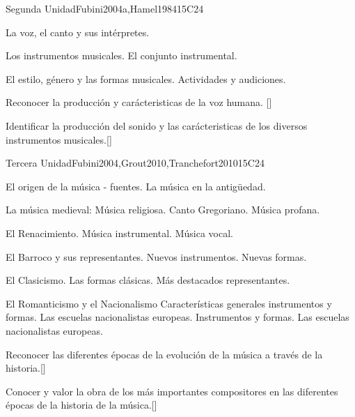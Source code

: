 \begin{syllabus}
\begin{unit}{}{Segunda Unidad}{Fubini2004a,Hamel1984}{15}{C24}
\begin{topics}
	\item La voz, el canto y sus intérpretes. 
	\item Los instrumentos musicales. 
		\subitem El conjunto instrumental.
	\item El estilo, género y las formas musicales. Actividades y audiciones.
\end{topics}
\begin{learningoutcomes}
	\item Reconocer la producción y carácteristicas de la voz humana. [\Usage]
	\item Identificar la producción del sonido y las carácteristicas de los diversos instrumentos musicales.[\Usage]
\end{learningoutcomes}
\end{unit}

\begin{unit}{}{Tercera Unidad}{Fubini2004,Grout2010,Tranchefort2010}{15}{C24}
\begin{topics}
	\item El origen de la música - fuentes. 
		\subitem La música en la antigüedad.
	\item La música medieval: Música religiosa.  
		\subitem Canto Gregoriano. 
		\subitem Música profana.
	\item El Renacimiento.
		\subitem Música instrumental.
		\subitem Música vocal.
	\item El Barroco y sus representantes. 
		\subitem Nuevos instrumentos.
		\subitem Nuevas formas.
	\item El Clasicismo.
		\subitem Las formas clásicas.
		\subitem Más destacados representantes.
	\item El Romanticismo y el Nacionalismo
		\subitem Características generales instrumentos y formas. 
		\subitem Las escuelas nacionalistas europeas.
		\subitem Instrumentos y formas. 
		\subitem Las escuelas nacionalistas europeas.
\end{topics}
\begin{learningoutcomes}
	\item Reconocer  las diferentes épocas de la evolución de la música a través de la historia.[\Usage]
	\item Conocer y valor la obra de los más importantes compositores en las diferentes épocas de la historia de la música.[\Usage]
\end{learningoutcomes}
\end{unit}


\end{syllabus}

